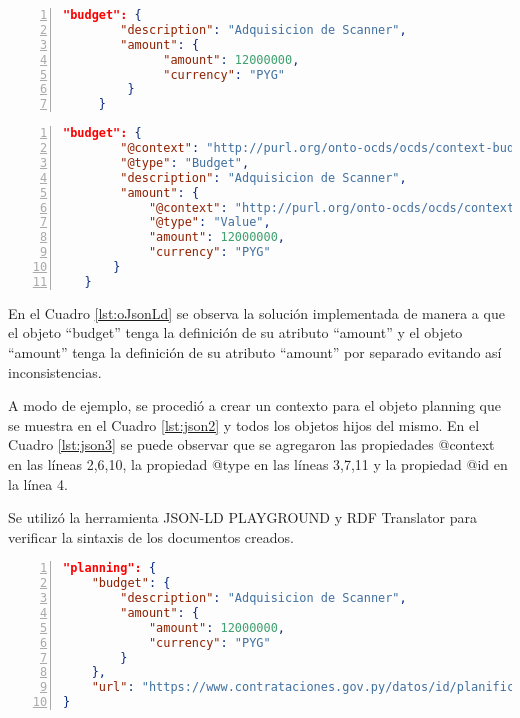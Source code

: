 \noindent\begin{minipage}{\textwidth}
\begin{lstlisting}[captionpos=b, caption=Objeto JSON con colisión semántica entre conceptos, label=lst:oJson,language=json,firstnumber=1,  numbers=left,  numberstyle=\tiny\color{mygray},frame=single]
    "budget": {
        "description": "Adquisicion de Scanner",
        "amount": {
              "amount": 12000000,
              "currency": "PYG"
         }
     }  
    \end{lstlisting}
\end{minipage}
\noindent
\begin{minipage}{\textwidth}
    \begin{lstlisting}[captionpos=b, caption=Objeto JSON-LD. Sin colisión semántica entre conceptos , label=lst:oJsonLd, language=json,firstnumber=1,  numbers=left,  numberstyle=\tiny\color{mygray},frame=single]
    "budget": {
        "@context": "http://purl.org/onto-ocds/ocds/context-budget.json",
        "@type": "Budget",
        "description": "Adquisicion de Scanner",
        "amount": {
            "@context": "http://purl.org/onto-ocds/ocds/context-value.json",
            "@type": "Value",
            "amount": 12000000,
            "currency": "PYG"
       }
   }   
        \end{lstlisting}
    \end{minipage}

        En el Cuadro \ref{lst:oJsonLd} se observa la solución implementada de manera a que el objeto “budget” tenga la definición de su atributo “amount” y el objeto “amount” tenga la definición de su atributo “amount” por separado evitando así inconsistencias.

A modo de ejemplo, se procedió a crear un contexto para el objeto planning que se muestra en el Cuadro \ref{lst:json2} y todos los objetos hijos del mismo. En el Cuadro \ref{lst:json3} se puede observar que se agregaron las propiedades @context en las líneas 2,6,10, la propiedad @type en las líneas 3,7,11 y la propiedad @id en la línea 4.

Se utilizó la herramienta JSON-LD PLAYGROUND \cite{JSONLDPl78:online} y RDF Translator \cite{RDFTrans0:online} para verificar la sintaxis de los documentos creados.\hfill \break

\noindent\begin{minipage}{\textwidth}
\begin{lstlisting}[captionpos=b, caption=Objeto JSON del OCDS de un Planning, label=lst:json2,  numbers=left, language=json, firstnumber=1, numberstyle=\tiny\color{mygray},frame=single]
"planning": {
    "budget": { 
        "description": "Adquisicion de Scanner",
        "amount": {
            "amount": 12000000,
            "currency": "PYG"
        }
    },
    "url": "https://www.contrataciones.gov.py/datos/id/planificaciones/193399-adquisicion-scanner"
}
\end{lstlisting}
\end{minipage}

